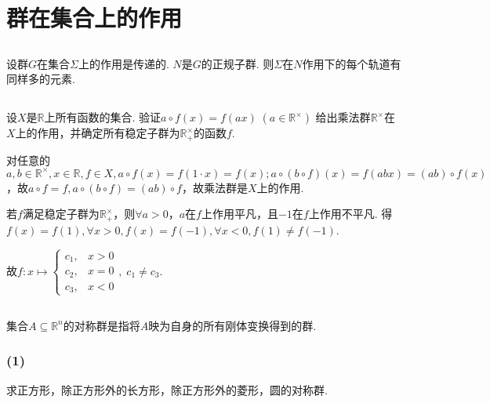 \section{群在集合上的作用}
\subsection{}
设群$G$在集合$\Sigma $上的作用是传递的. $N$是$G$的正规子群. 则$\Sigma$在$N$作用下的每个轨道有同样多的元素.


\subsection{}
设$X$是$\mathbb{R}$上所有函数的集合. 验证$a\circ f(x)=f(ax)\;(a\in\mathbb{R}^{\times})$
给出乘法群$\mathbb{R}^{\times}$在$X$上的作用，并确定所有稳定子群为$\mathbb{R}_+^{\times}$的函数$f$.

\jie
对任意的$a,b\in\mathbb{R}^{\times}, x\in\mathbb{R}, f\in X, a\circ f(x)=f(1\cdot x)=f(x); a\circ (b\circ f)(x)=f(abx)=(ab)\circ f(x)$，故$a\circ f=f, a\circ(b\circ f)=(ab)\circ f$，故乘法群是$X$上的作用.

若$f$满足稳定子群为$\mathbb{R}_+^{\times}$，则$\forall a>0$，$a$在$f$上作用平凡，且$-1$在$f$上作用不平凡. 得$f(x)=f(1), \forall x>0, f(x)=f(-1), \forall x<0, f(1)\neq f(-1)$.

故$f: x\mapsto\left\{
\begin{matrix}
c_1, & x>0\\
c_2, & x=0\\
c_3, & x<0
\end{matrix}
\right.,\;c_1\neq c_3.$

\subsection{}
集合$A\subseteq \mathbb{R}^n$的对称群是指将$A$映为自身的所有刚体变换得到的群.
\subsubsection{(1)}
求正方形，除正方形外的长方形，除正方形外的菱形，圆的对称群.

